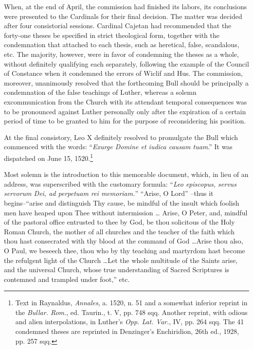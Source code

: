 When, at the end of April, the commission had finished its labors,
its conclusions were presented to the Cardinals for their final decision.
The matter was decided after four consistorial sessions. Cardinal Cajetan
had recommended that the forty-one theses be specified
in strict theological form, together with the condemnation that attached
to each thesis, such as heretical, false, scandalous, etc. The majority,
however, were in favor of condemning the theses as a whole,
without definitely qualifying each separately, following the example
of the Council of Constance when it condemned the errors of Wiclif
and Hus. The commission, moreover, unanimously resolved that the
forthcoming Bull should be principally a condemnation of the false
teachings of Luther, whereas a solemn excommunication from the
Church with its attendant temporal consequences was to be pronounced against
Luther personally only after the expiration of a
certain period of time to be granted to him for the purpose of reconsidering
his position.

At the final consistory, Leo X definitely resolved to promulgate the
Bull which commenced with the words: “\textit{Exurge Domine et iudica
causam tuam}.” It was dispatched on June 15, 1520.\footnote
{Text in Raynaldus, \textit{Annales}, a. 1520, n. 51 and a somewhat inferior reprint in the
\textit{Bullar. Rom.}, ed. Taurin., t. V, pp. 748 sqq. Another reprint, with odious and alien interpolations,
in Luther’s \textit{Opp. Lat. Var.}, IV, pp. 264 sqq. The 41 condemned theses are
reprinted in Denzinger’s Enchiridion, 26th ed., 1928, pp. 257 sqq.}


Most solemn is the introduction to this memorable document, which, in
lieu of an address, was superscribed with the customary formula: ``\textit{Leo episcopus,
servus servorum Dei, ad perpetuam rei memoriam.}” “Arise, O Lord”
--thus it begins--``arise and distinguish Thy cause, be mindful of the insult
which foolish men have heaped upon Thee without intermission \dots
Arise, O Peter, and, mindful of the pastoral office entrusted to thee by God,
be thou solicitous of the Holy Roman Church, the mother of all churches
and the teacher of the faith which thou hast consecrated with thy blood
at the command of God \dots Arise thou also, O Paul, we beseech thee,
thou who by thy teaching and martyrdom hast become the refulgent light
of the Church \dots Let the whole multitude of the Saints arise, and the
universal Church, whose true understanding of Sacred Scriptures is
contemned and trampled under foot,” etc.

